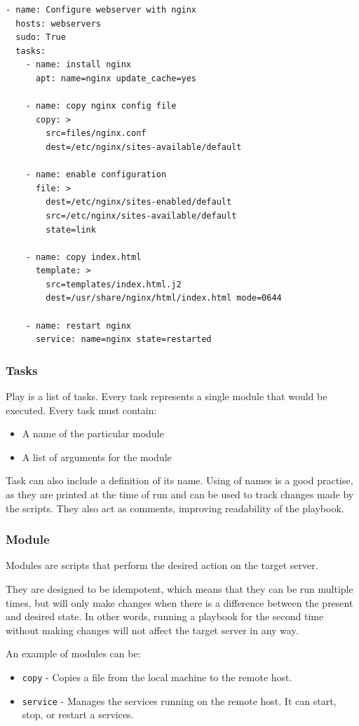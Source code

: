 \begin{lstlisting}
- name: Configure webserver with nginx
  hosts: webservers
  sudo: True
  tasks:
    - name: install nginx
      apt: name=nginx update_cache=yes

    - name: copy nginx config file
      copy: >
        src=files/nginx.conf
        dest=/etc/nginx/sites-available/default

    - name: enable configuration
      file: >
        dest=/etc/nginx/sites-enabled/default
        src=/etc/nginx/sites-available/default
        state=link

    - name: copy index.html
      template: >
        src=templates/index.html.j2
        dest=/usr/share/nginx/html/index.html mode=0644

    - name: restart nginx
      service: name=nginx state=restarted
\end{lstlisting}
\cite{UpAndRunning}


\subsubsection*{Tasks}

Play is a list of tasks. Every task represents a single module that would be executed. Every task must contain:
\begin{itemize}
  \item{A name of the particular module}
  \item{A list of arguments for the module}
\end{itemize}

Task can also include a definition of its name. Using of names is a good practise, as they are printed at the time of run and can be used to track changes made by the scripts. They also act as comments, improving readability of the playbook.

\subsubsection*{Module}

Modules are scripts that perform the desired action on the target server.

They are designed to be idempotent, which means that they can be run multiple times, but will only make changes when there is a difference between the present and desired state. In other words, running a playbook for the second time without making changes will not affect the target server in any way.

An example of modules can be:
\begin{itemize}
  \item{\texttt{copy} - Copies a file from the local machine to the remote host.}
  \item{\texttt{service} - Manages the services running on the remote host. It can start, stop, or restart a services.}
\end{itemize}



